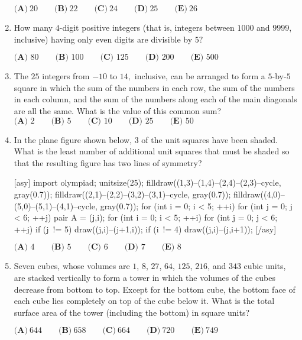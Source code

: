 \documentclass{article}%
\begin{document}
\begin{enumerate}
$\textbf{(A)}\ 20\qquad\textbf{(B)}\ 22\qquad\textbf{(C)}\ 24\qquad\textbf{(D)}\ 25\qquad\textbf{(E)}\ 26$

%
\item%
[\textbf{Problem 4}]How many $4$-digit positive integers (that is, integers between $1000$ and $9999$, inclusive) having only even digits are divisible by $5?$

$\textbf{(A) } 80 \qquad \textbf{(B) } 100 \qquad \textbf{(C) } 125 \qquad \textbf{(D) } 200 \qquad \textbf{(E) } 500$

%
\item%
[\textbf{Problem 5}]The $25$ integers from $-10$ to $14,$ inclusive, can be arranged to form a $5$-by-$5$ square in which the sum of the numbers in each row, the sum of the numbers in each column, and the sum of the numbers along each of the main diagonals are all the same. What is the value of this common sum?
$\textbf{(A) }2 \qquad\textbf{(B) } 5\qquad\textbf{(C) } 10\qquad\textbf{(D) } 25\qquad\textbf{(E) } 50$

%
\item%
[\textbf{Problem 6}]In the plane figure shown below, $3$ of the unit squares have been shaded. What is the least number of additional unit squares that must be shaded so that the resulting figure has two lines of symmetry?

[asy] import olympiad; unitsize(25); filldraw((1,3)--(1,4)--(2,4)--(2,3)--cycle, gray(0.7)); filldraw((2,1)--(2,2)--(3,2)--(3,1)--cycle, gray(0.7)); filldraw((4,0)--(5,0)--(5,1)--(4,1)--cycle, gray(0.7)); for (int i = 0; i < 5; ++i) { for (int j = 0; j < 6; ++j) { pair A = (j,i);  } } for (int i = 0; i < 5; ++i) { for (int j = 0; j < 6; ++j) { if (j != 5) { draw((j,i)--(j+1,i)); } if (i != 4) { draw((j,i)--(j,i+1)); } } } [/asy]

$\textbf{(A) } 4 \qquad \textbf{(B) } 5 \qquad \textbf{(C) } 6 \qquad \textbf{(D) } 7 \qquad \textbf{(E) } 8$

%
\item%
[\textbf{Problem 7}]Seven cubes, whose volumes are $1$, $8$, $27$, $64$, $125$, $216$, and $343$ cubic units, are stacked vertically to form a tower in which the volumes of the cubes decrease from bottom to top. Except for the bottom cube, the bottom face of each cube lies completely on top of the cube below it. What is the total surface area of the tower (including the bottom) in square units?

$\textbf{(A)}\ 644\qquad\textbf{(B)}\ 658\qquad\textbf{(C)}\ 664\qquad\textbf{(D)}\ 720\qquad\textbf{(E)}\ 749$


\end{enumerate}
\end{document}
